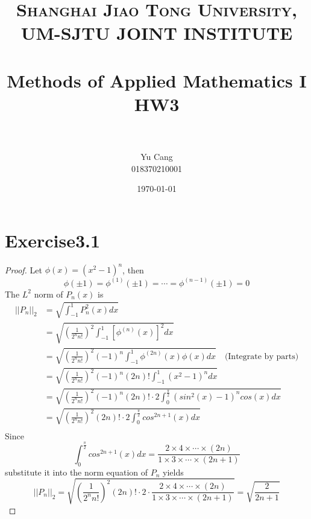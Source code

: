 \documentclass[paper=a4, fontsize=11pt]{scrartcl} %
\title{	
\normalfont \normalsize 
\textsc{Shanghai Jiao Tong University, UM-SJTU JOINT INSTITUTE} \\ [25pt] %
\horrule{0.5pt} \\[0.4cm] %
\huge Methods of Applied Mathematics I\\ HW3 \\ %
\horrule{2pt} \\[0.5cm] %
}
\author{Yu Cang \\ 018370210001} %
\date{\normalsize \today} %
\numberwithin{equation}{section} %
\numberwithin{figure}{section} %
\numberwithin{table}{section} %
\begin{document}
\maketitle %

\section{Exercise3.1}
	\begin{proof}
		Let $\phi(x) = (x^2 - 1)^n$, then
		\begin{equation}
			\phi(\pm 1) = \phi^{(1)}(\pm 1) = \cdots = \phi^{(n-1)}(\pm 1) = 0
		\end{equation}
		The $L^2$ norm of $P_n(x)$ is
		\begin{equation}
			\begin{aligned}
				||P_n||_2  & = \sqrt{\int_{-1}^{1} P_n^2(x) dx}\\
						   & = \sqrt{(\frac{1}{2^n n!})^2 \int_{-1}^{1} [\phi^{(n)}(x)]^2 dx}\\
						   & = \sqrt{(\frac{1}{2^n n!})^2 (-1)^n \int_{-1}^{1} \phi^{(2n)}(x) \phi(x) dx} \quad \text{(Integrate by parts)}\\
						   & = \sqrt{(\frac{1}{2^n n!})^2 (-1)^n (2n)! \int_{-1}^{1} (x^2 - 1)^n dx}\\
						   & = \sqrt{(\frac{1}{2^n n!})^2 (-1)^n (2n)! \cdot 2 \int_{0}^{\frac{\pi}{2}} (sin^2(x) - 1)^n cos(x) dx}\\
						   & = \sqrt{(\frac{1}{2^n n!})^2 (2n)! \cdot 2 \int_{0}^{\frac{\pi}{2}} cos^{2n+1}(x) dx}\\
			\end{aligned}
		\end{equation}
		Since
		\begin{equation}
			\int_{0}^{\frac{\pi}{2}} cos^{2n+1}(x) dx = \frac{2 \times 4 \times \cdots \times (2n)}{1\times3\times \cdots \times (2n+1)} 
		\end{equation}
		substitute it into the norm equation of $P_n$ yields
		\begin{equation}
			||P_n||_2 = \sqrt{(\frac{1}{2^n n!})^2 (2n)! \cdot 2 \cdot \frac{2 \times 4 \times \cdots \times (2n)}{1\times3\times \cdots \times(2n+1)}} = \sqrt{\frac{2}{2n+1}}
		\end{equation}
	\end{proof}
\end{document}
